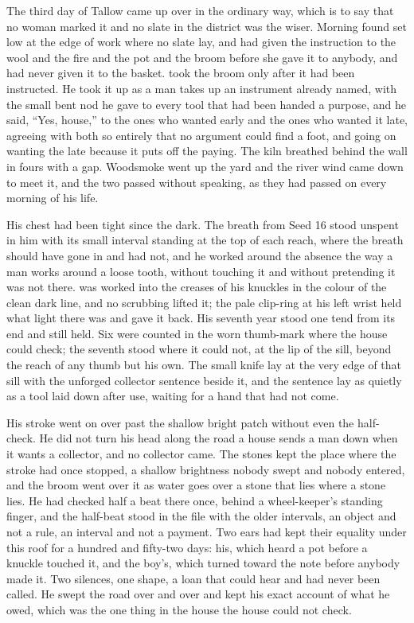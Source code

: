 
The third day of Tallow came up over  in the ordinary way, which is to say that no woman marked it and no slate in the district was the wiser. Morning found  set low at the edge of  work where no slate lay, and  had given the instruction to the wool and the fire and the pot and the broom before she gave it to anybody, and had never given it to the basket.  took the broom only after it had been instructed. He took it up as a man takes up an instrument already named, with the small bent nod he gave to every tool that had been handed a purpose, and he said, “Yes, house,” to the ones who wanted  early and the ones who wanted it late, agreeing with both so entirely that no argument could find a foot, and going on wanting the late because it puts off the paying. The kiln breathed behind the wall in fours with a gap. Woodsmoke went up the yard and the river wind came down to meet it, and the two passed without speaking, as they had passed on every morning of his life.

His chest had been tight since the dark. The breath from Seed 16 stood unspent in him with its small interval standing at the top of each reach, where the breath should have gone in and had not, and he worked around the absence the way a man works around a loose tooth, without touching it and without pretending it was not there.  was worked into the creases of his knuckles in the colour of the clean dark line, and no scrubbing lifted it; the pale clip-ring at his left wrist held what light there was and gave it back. His seventh year stood one tend from its end and still held. Six were counted in the worn thumb-mark where the house could check; the seventh stood where it could not, at the lip of the sill, beyond the reach of any thumb but his own. The small knife lay at the very edge of that sill with the unforged collector sentence beside it, and the sentence lay as quietly as a tool laid down after use, waiting for a hand that had not come.

His stroke went on over  past the shallow bright patch without even the half-check. He did not turn his head along the road a house sends a man down when it wants a collector, and no collector came. The stones kept the place where the stroke had once stopped, a shallow brightness nobody swept and nobody entered, and the broom went over it as water goes over a stone that lies where a stone lies. He had checked half a beat there once, behind a wheel-keeper's standing finger, and the half-beat stood in the file with the older intervals, an object and not a rule, an interval and not a payment. Two ears had kept their equality under this roof for a hundred and fifty-two days: his, which heard a pot before a knuckle touched it, and the boy's, which turned toward the note before anybody made it. Two silences, one shape, a loan that could hear and had never been called. He swept the road over and over and kept his exact account of what he owed, which was the one thing in the house the house could not check.

